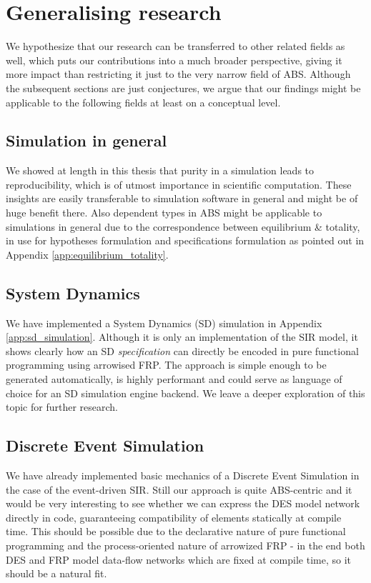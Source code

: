 \section{Generalising research}
We hypothesize that our research can be transferred to other related fields as well, which puts our contributions into a much broader perspective, giving it more impact than restricting it just to the very narrow field of ABS. Although the subsequent sections are just conjectures, we argue that our findings might be applicable to the following fields at least on a conceptual level.

\subsection{Simulation in general}
We showed at length in this thesis that purity in a simulation leads to reproducibility, which is of utmost importance in scientific computation. These insights are easily transferable to simulation software in general and might be of huge benefit there. Also dependent types in ABS might be applicable to simulations in general due to the correspondence between equilibrium \& totality, in use for hypotheses formulation and specifications formulation as pointed out in Appendix \ref{app:equilibrium_totality}. 

\subsection{System Dynamics}
We have implemented a System Dynamics (SD) simulation in Appendix \ref{app:sd_simulation}. Although it is only an implementation of the SIR model, it shows clearly how an SD \textit{specification} can directly be encoded in pure functional programming using arrowised FRP. The approach is simple enough to be generated automatically, is highly performant and could serve as language of choice for an SD simulation engine backend. We leave a deeper exploration of this topic for further research.

\subsection{Discrete Event Simulation}
We have already implemented basic mechanics of a Discrete Event Simulation in the case of the event-driven SIR. Still our approach is quite ABS-centric and it would be very interesting to see whether we can express the DES model network directly in code, guaranteeing compatibility of elements statically at compile time. This should be possible due to the declarative nature of pure functional programming and the process-oriented nature of arrowized FRP - in the end both DES and FRP model data-flow networks which are fixed at compile time, so it should be a natural fit.

